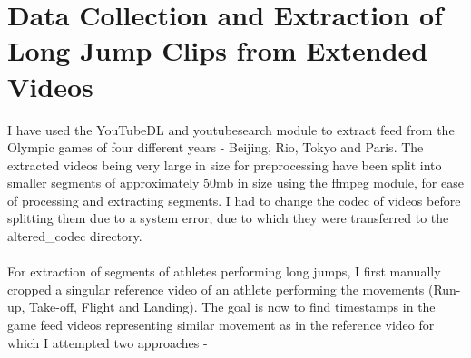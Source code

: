 \documentclass[12pt, letterpaper]{article}
\begin{document}
 \section{Data Collection and Extraction of Long Jump Clips from Extended Videos}
I have used the YouTubeDL and youtubesearch module to extract feed from
the Olympic games of four different years - Beijing, Rio, Tokyo and Paris.
The extracted videos being very large in size for preprocessing have been split
into smaller segments of approximately 50mb in size using the ffmpeg module,
 for ease of processing and extracting segments. I had to change the codec of videos before splitting them due to a system error, due to which they were transferred to the altered_codec directory.
 \\\\For extraction of segments of athletes performing long jumps, 
 I first manually cropped a singular reference video of an athlete performing 
 the movements (Run-up, Take-off, Flight and Landing). The goal is now to find timestamps
 in the game feed videos representing similar movement as in the reference video for which I attempted two approaches - 
\end{document}
